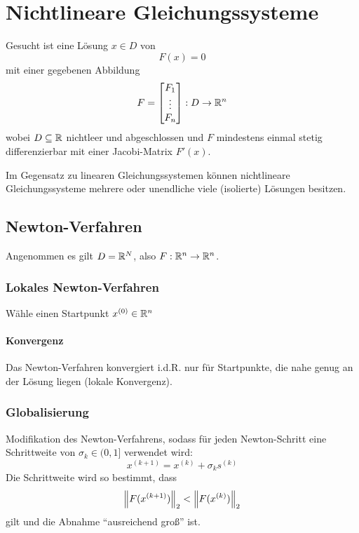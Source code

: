 	\chapter{Nichtlineare Gleichungssysteme}
		Gesucht ist eine Lösung \( x \in D \) von \[ F(x) = 0 \] mit einer gegebenen Abbildung
		\begin{equation*}
			F =
			\begin{bmatrix}
				F_1    \\
				\vdots \\
				F_n
			\end{bmatrix}
			: D \rightarrow \mathbb{R}^n
		\end{equation*}
		wobei \( D \subseteq \mathbb{R} \) nichtleer und abgeschlossen und \(F\) mindestens einmal stetig differenzierbar mit einer Jacobi-Matrix \(F'(x)\).

		Im Gegensatz zu linearen Gleichungssystemen können nichtlineare Gleichungssysteme mehrere oder unendliche viele (isolierte) Lösungen besitzen.

		\section{Newton-Verfahren}
			Angenommen es gilt \( D = \mathbb{R}^N \), also \( F : \mathbb{R}^n \rightarrow \mathbb{R}^n \).

			\subsection{Lokales Newton-Verfahren}
				\begin{algorithm}[H]
					Wähle einen Startpunkt \( x^{(0)} \in \mathbb{R}^n \) \\
				\end{algorithm}

				\subsubsection{Konvergenz}
					Das Newton-Verfahren konvergiert i.d.R. nur für Startpunkte, die nahe genug an der Lösung liegen (lokale Konvergenz).

			\subsection{Globalisierung}
				Modifikation des Newton-Verfahrens, sodass für jeden Newton-Schritt eine Schrittweite von \( \sigma_k \in (0, 1] \) verwendet wird:
				\begin{equation*}
					x^{(k + 1)} = x^{(k)} + \sigma_k s^{(k)}
				\end{equation*}
				Die Schrittweite wird so bestimmt, dass \[ \norm{F(x^{(k+1)})}_2 < \norm{F(x^{(k)})}_2 \] gilt und die Abnahme \enquote{ausreichend groß} ist.


